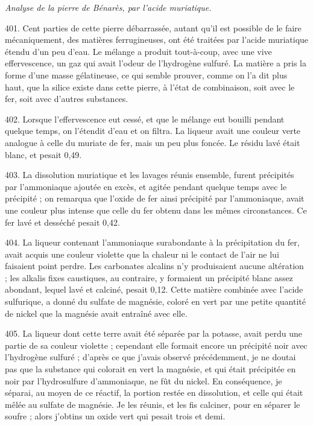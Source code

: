 \documentclass[a4paper, 11pt, oneside, polutonikogreek, french]{article}
\begin{document}
\emph{Analyse de la pierre de Bénarès, par l'acide muriatique.}

401. Cent parties de cette pierre débarrassée, autant qu'il est possible de le faire mécaniquement, des matières ferrugineuses, ont été traitées par l'acide muriatique étendu d'un peu d'eau. Le mélange a produit tout-à-coup, avec une vive effervescence, un gaz qui avait l'odeur de l'hydrogène sulfuré. La matière a pris la forme d'une masse gélatineuse, ce qui semble prouver, comme on l'a dit plus haut, que la silice existe dans cette pierre, à l'état de combinaison, soit avec le fer, soit avec d'autres substances.

402. Lorsque l'effervescence eut cessé, et que le mélange eut bouilli pendant quelque temps, on l'étendit d'eau et on filtra. La liqueur avait une couleur verte analogue à celle du muriate de fer, mais un peu plus foncée. Le résidu lavé était blanc, et pesait 0,49.

403. La dissolution muriatique et les lavages réunis ensemble, furent précipités par l'ammoniaque ajoutée en excès, et agitée pendant quelque temps avec le précipité ; on remarqua que l'oxide de fer ainsi précipité par l'ammoniaque, avait une couleur plus intense que celle du fer obtenu dans les mêmes circonstances. Ce fer lavé et desséché pesait 0,42.

404. La liqueur contenant l'ammoniaque surabondante à la précipitation du fer, avait acquis une couleur violette que la chaleur ni le contact de l'air ne lui faisaient point perdre. Les carbonates alcalins n'y produisaient aucune altération ; les alkalis fixes caustiques, au contraire, y formaient un précipité blanc assez abondant, lequel lavé et calciné, pesait 0,12. Cette matière combinée avec l'acide sulfurique, a donné du sulfate de magnésie, coloré en vert par une petite quantité de nickel que la magnésie avait entraîné avec elle.

405. La liqueur dont cette terre avait été séparée par la potasse, avait perdu une partie de sa couleur violette ; cependant elle formait encore un précipité noir avec l'hydrogène sulfuré ; d'après ce que j'avais observé précédemment, je ne doutai pas que la substance qui colorait en vert la magnésie, et qui était précipitée en noir par l'hydrosulfure d'ammoniaque, ne fût du nickel. En conséquence, je séparai, au moyen de ce réactif, la portion restée en dissolution, et celle qui était mêlée au sulfate de magnésie. Je les réunis, et les fis calciner, pour en séparer le soufre ; alors j'obtins un oxide vert qui pesait trois et demi.
\end{document}
